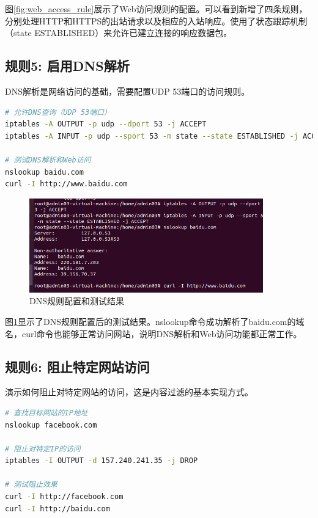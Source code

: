 \documentclass[12pt,a4paper]{article}
\begin{document}
图\ref{fig:web_access_rule}展示了Web访问规则的配置。可以看到新增了四条规则，分别处理HTTP和HTTPS的出站请求以及相应的入站响应。使用了状态跟踪机制（state ESTABLISHED）来允许已建立连接的响应数据包。

\subsection{规则5: 启用DNS解析}

DNS解析是网络访问的基础，需要配置UDP 53端口的访问规则。

\begin{lstlisting}[language=bash, caption=配置DNS解析规则]
# 允许DNS查询（UDP 53端口）
iptables -A OUTPUT -p udp --dport 53 -j ACCEPT
iptables -A INPUT -p udp --sport 53 -m state --state ESTABLISHED -j ACCEPT

# 测试DNS解析和Web访问
nslookup baidu.com
curl -I http://www.baidu.com
\end{lstlisting}

\begin{figure}[H]
    \centering
    \includegraphics[width=0.9\textwidth]{07_dns_rule.png}
    \caption{DNS规则配置和测试结果}
    \label{fig:dns_rule}
\end{figure}

图\ref{fig:dns_rule}显示了DNS规则配置后的测试结果。nslookup命令成功解析了baidu.com的域名，curl命令也能够正常访问网站，说明DNS解析和Web访问功能都正常工作。

\subsection{规则6: 阻止特定网站访问}

演示如何阻止对特定网站的访问，这是内容过滤的基本实现方式。

\begin{lstlisting}[language=bash, caption=阻止特定网站访问]
# 查找目标网站的IP地址
nslookup facebook.com

# 阻止对特定IP的访问
iptables -I OUTPUT -d 157.240.241.35 -j DROP

# 测试阻止效果
curl -I http://facebook.com
curl -I http://baidu.com
\end{lstlisting}
\end{document}
